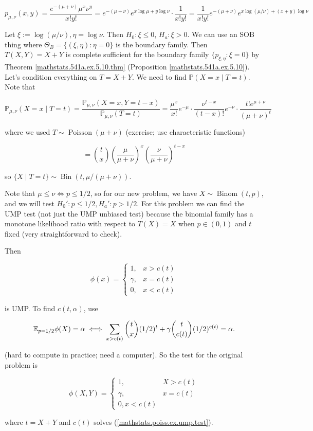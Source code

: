 \begin{solution}

\[
p_{\mu, \nu}(x,y) = \frac{e^{-(\mu + \nu)} \mu^x \nu^y}{x!y!} = e^{-(\mu + \nu)} e^{x \log \mu + y \log \nu} \cdot \frac{1}{x!y!} 
=  \frac{1}{x!y!}  e^{-(\mu + \nu)} e^{x \log (\mu/\nu) + (x+ y) \log \nu} 
\]

Let \(\xi := \log(\mu/\nu), \eta = \log \nu\). Then \(H_0: \xi \leq 0\), \(H_a: \xi > 0\). We can use an SOB thing where \(\Theta_B = \{ (\xi, \eta) : \eta = 0\}\) is the boundary family. Then \(T(X,Y) = X + Y \) is complete sufficient for the boundary family \(\{p_{\xi, \eta} : \xi = 0\}\) by Theorem \ref{mathstats.541a.ex.5.10.thm} (Proposition \ref{mathstats.541a.ex.5.10}). Let's condition everything on \(T = X + Y\). We need to find \(\mathbb{P}(X =x \mid T = t)\). Note that

\[
\mathbb{P}_{\mu, \nu} (X = x \mid T = t) = \frac{\mathbb{P}_{\mu, \nu} (X = x , Y = t - x) }{\mathbb{P}_{\mu, \nu} (T = t) } = \frac{\mu^x}{x!} e^{-\mu} \cdot \frac{ \nu^{t-x}}{(t-x)!} e^{-\nu} \cdot \frac{t! e^{\mu + \nu} }{(\mu + \nu)^t}
\]

where we used \(T \sim \operatorname{Poisson}(\mu + \nu)\) (exercise; use characteristic functions)

\[
= \binom{t}{x} \left( \frac{\mu}{\mu + \nu} \right)^x \left( \frac{\nu}{\mu + \nu} \right)^{t-x}
\]

so \(\{X \mid T = t\} \sim \operatorname{Bin}(t, \mu/(\mu + \nu))\). 

Note that \(\mu \leq \nu \iff p \leq 1/2\), so for our new problem, we have \(X \sim \operatorname{Binom}(t, p)\), and we will test \(H_0': p \leq 1/2, H_a': p > 1/2\). For this problem we can find the UMP test (not just the UMP unbiased test) because the binomial family has a monotone likelihood ratio with respect to \(T(X) = X\) when \(p \in (0,1)\) and \(t\) fixed (very straightforward to check). 

Then

\[
\phi(x) = \begin{cases}
1, & x > c(t) \\
\gamma, & x = c(t) \\
0, & x < c(t)
\end{cases}
\]

is UMP. To find \(c(t, \alpha)\), use

\begin{equation}\label{mathstats.poiss.ex.ump.test}
\E_{p = 1/2} \phi(X) = \alpha \iff \sum_{x > c(t)} \binom{t}{x} (1/2)^t + \gamma \binom{t}{c(t)} (1/2)^{c(t)} = \alpha.
\end{equation}

(hard to compute in practice; need a computer). So the test for the original problem is 

\[
\phi(X, Y) = \begin{cases}
1, & X > c(t) \\
\gamma, & x =c(t) \\
0, x < c(t)
\end{cases}
\]

where \(t = X + Y\) and \(c(t)\) solves (\ref{mathstats.poiss.ex.ump.test}).

\end{solution}

